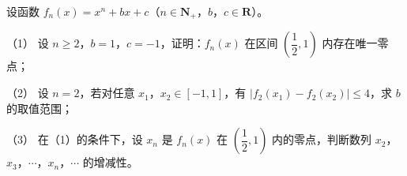 \begin{question}
设函数 $f_n(x)=x^n+bx+c$（$n\in\mathbf N_+$，$b$，$c\in\mathbf R$）。

（1） 设 $n\geqslant2$，$b=1$，$c=-1$，证明：$f_n(x)$ 在区间 $\left(\dfrac12,1\right)$ 内存在唯一零点；

（2） 设 $n=2$，若对任意 $x_1$，$x_2\in[-1,1]$，有 $|f_2(x_1)-f_2(x_2)|\leqslant4$，求 $b$ 的取值范围；

（3） 在（1）的条件下，设 $x_n$ 是 $f_n(x)$ 在 $\left(\dfrac12,1\right)$ 内的零点，判断数列 $x_2$，$x_3$，$\cdots$，$x_n$，$\cdots$ 的增减性。

\end{question}